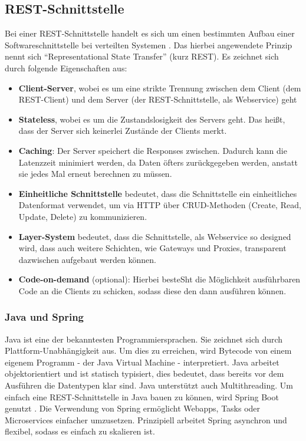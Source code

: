 	\subsection{REST-Schnittstelle}
	Bei einer REST-Schnittstelle handelt es sich um einen bestimmten Aufbau einer Softwareschnittstelle bei verteilten Systemen \cite{Patni2017}. Das hierbei angewendete Prinzip nennt sich \enquote{Representational State Transfer} (kurz REST). Es zeichnet sich durch folgende Eigenschaften aus:
	\begin{itemize}
		\item \textbf{Client-Server}, wobei es um eine strikte Trennung zwischen dem Client (dem REST-Client) und dem Server (der REST-Schnittstelle, als Webservice) geht
		\item \textbf{Stateless}, wobei es um die Zustandslosigkeit des Servers geht. Das heißt, dass der Server sich keinerlei Zustände der Clients merkt.
		\item \textbf{Caching}: Der Server speichert die Responses zwischen. Dadurch kann die Latenzzeit minimiert werden, da Daten öfters zurückgegeben werden, anstatt sie jedes Mal erneut berechnen zu müssen.
		\item \textbf{Einheitliche Schnittstelle} bedeutet, dass die Schnittstelle ein einheitliches Datenformat verwendet, um via HTTP über CRUD-Methoden (Create, Read, Update, Delete) zu kommunizieren.
		\item \textbf{Layer-System} bedeutet, dass die Schnittstelle, als Webservice so designed wird, dass auch weitere Schichten, wie Gateways und Proxies, transparent dazwischen aufgebaut werden können.
		\item \textbf{Code-on-demand} (optional): Hierbei besteSht die Möglichkeit ausführbaren Code an die Clients zu schicken, sodass diese den dann ausführen können.
	\end{itemize}
		\subsubsection{Java und Spring}
		Java ist eine der bekanntesten Programmiersprachen. Sie zeichnet sich durch Plattform-Unabhängigkeit aus\cite{jdkDocs}. Um dies zu erreichen, wird Bytecode von einem eigenem Programm - der Java Virtual Machine - interpretiert. Java arbeitet objektorientiert und ist statisch typisiert, dies bedeutet, dass bereits vor dem Ausführen die Datentypen klar sind. Java unterstützt auch Multithreading. Um einfach eine REST-Schnittstelle in Java bauen zu können, wird Spring Boot genutzt \cite{springDocs}. Die Verwendung von Spring ermöglicht Webapps, Tasks oder Microservices einfacher umzusetzen. Prinzipiell arbeitet Spring asynchron und flexibel, sodass es einfach zu skalieren ist. 
		
